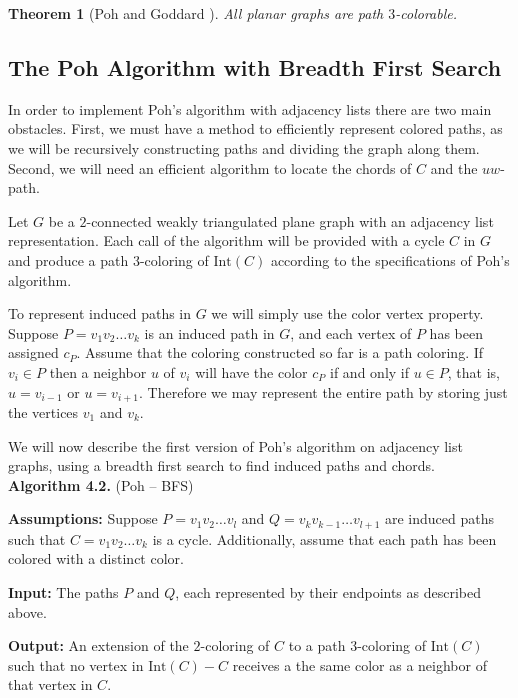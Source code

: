 \documentclass[letterpaper, 12pt]{article}
\theoremstyle{thm}
\newtheorem{theorem}{Theorem}[section]
\begin{document}
\begin{theorem}[Poh \cite{poh} and Goddard \cite{goddard}]
All planar graphs are path $3$-colorable.
\end{theorem}

\subsection{The Poh Algorithm with Breadth First Search}

In order to implement Poh's algorithm with adjacency lists there are two main
obstacles. First, we must have a method to efficiently represent colored paths,
as we will be recursively constructing paths and dividing the graph along them.
Second, we will need an efficient algorithm to locate the chords of $C$ and the
$uw$-path.

Let $G$ be a $2$-connected weakly triangulated plane graph with an adjacency
list representation. Each call of the algorithm will be provided with a cycle
$C$ in $G$ and produce a path $3$-coloring of $\text{Int}(C)$ according to the
specifications of Poh's algorithm.

To represent induced paths in $G$ we will simply use the color vertex property.
Suppose $P=v_1v_2\ldots v_k$ is an induced path in $G$, and each vertex of $P$
has been assigned $c_P$. Assume that the coloring constructed so far is a path coloring. If
$v_i\in P$ then a neighbor $u$ of $v_i$ will have the color $c_P$ if and only if
$u\in P$, that is, $u=v_{i-1}$ or $u=v_{i+1}$. Therefore we may represent the
entire path by storing just the vertices $v_1$ and $v_k$. 

We will now describe the first version of Poh's algorithm on adjacency list
graphs, using a breadth first search to find induced paths and chords.\\

\noindent\textbf{Algorithm 4.2.} (Poh -- BFS)

\noindent\textbf{Assumptions:} Suppose $P=v_1v_2\ldots v_l$ and
$Q=v_kv_{k-1}\ldots v_{l+1}$ are induced
paths such that $C=v_1v_2\ldots v_k$ is a cycle. Additionally, assume that each
path has been colored with a distinct color.

\noindent\textbf{Input:} The paths $P$ and $Q$, each represented by their
endpoints as described above.

\noindent\textbf{Output:} An extension of the $2$-coloring of $C$ to
a path $3$-coloring of $\text{Int}(C)$ such that
no vertex in $\text{Int}(C)-C$ receives a the same color as a neighbor of that
vertex in $C$.
\end{document}
